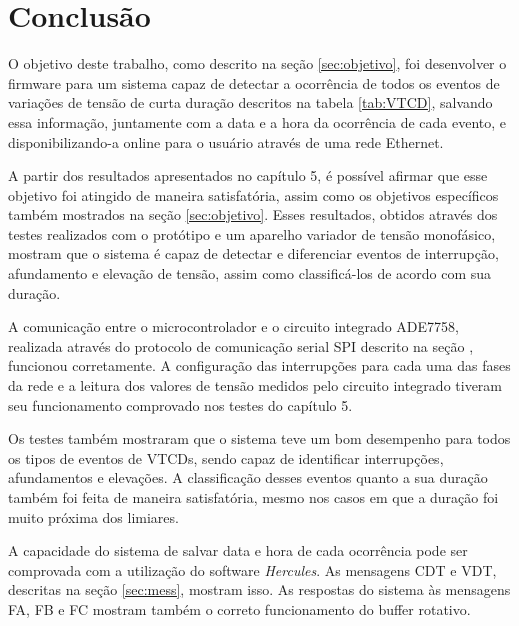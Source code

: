 
\chapter{Conclus{\~a}o}

O objetivo deste trabalho, como descrito na se{\c{c}}{\~a}o \ref{sec:objetivo}, foi desenvolver o firmware para um sistema capaz de detectar a ocorr{\^e}ncia de todos os eventos de varia{\c{c}}{\~o}es de tens{\~a}o de curta dura{\c{c}}{\~a}o descritos na tabela \ref{tab:VTCD}, salvando essa informa{\c{c}}{\~a}o, juntamente com a data e a hora da ocorr{\^e}ncia de cada evento, e disponibilizando-a online para o usu{\'a}rio atrav{\'e}s de uma rede Ethernet.  

A partir dos resultados apresentados no cap{\'i}tulo 5, {\'e} poss{\'i}vel afirmar que esse objetivo foi atingido de maneira satisfat{\'o}ria, assim como os objetivos espec{\'i}ficos tamb{\'e}m mostrados na se{\c{c}}{\~a}o \ref{sec:objetivo}. Esses resultados, obtidos atrav{\'e}s dos testes realizados com o prot{\'o}tipo e um aparelho variador de tens{\~a}o monof{\'a}sico, mostram que o sistema {\'e} capaz de detectar e diferenciar eventos de interrup{\c{c}}{\~a}o, afundamento e eleva{\c{c}}{\~a}o de tens{\~a}o, assim como classific{\'a}-los de acordo com sua dura{\c{c}}{\~a}o.

A comunica{\c{c}}{\~a}o entre o microcontrolador e o circuito integrado ADE7758, realizada atrav{\'e}s do protocolo de comunica{\c{c}}{\~a}o serial SPI descrito na se{\c{c}}{\~a}o \label{sec:spi}, funcionou corretamente. A configura{\c{c}}{\~a}o das interrup{\c{c}}{\~o}es para cada uma das fases da rede e a leitura dos valores de tens{\~a}o medidos pelo circuito integrado tiveram seu funcionamento comprovado nos testes do cap{\'i}tulo 5.

Os testes tamb{\'e}m mostraram que o sistema teve um bom desempenho para todos os tipos de eventos de VTCDs, sendo capaz de identificar interrup{\c{c}}{\~o}es, afundamentos e eleva{\c{c}}{\~o}es. A classifica{\c{c}}{\~a}o desses eventos quanto a sua dura{\c{c}}{\~a}o tamb{\'e}m foi feita de maneira satisfat{\'o}ria, mesmo nos casos em que a dura{\c{c}}{\~a}o foi muito pr{\'o}xima dos limiares.

A capacidade do sistema de salvar data e hora de cada ocorr{\^e}ncia pode ser comprovada com a utiliza{\c{c}}{\~a}o do software \textit{Hercules}. As mensagens CDT e VDT, descritas na se{\c{c}}{\~a}o \ref{sec:mess}, mostram isso. As respostas do sistema {\`a}s mensagens FA, FB e FC mostram tamb{\'e}m o correto funcionamento do buffer rotativo. 

